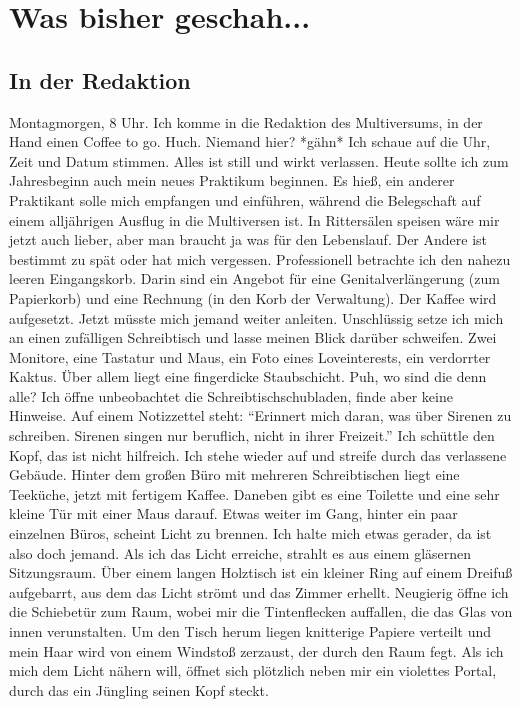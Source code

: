 \documentclass[final]{multiversum}
\begin{document}
\makemultititle
%

\section{Was bisher geschah...}

\subsection{In der Redaktion}
Montagmorgen, 8 Uhr. 
Ich komme in die Redaktion des Multiversums, in der Hand einen Coffee to go.
Huch. Niemand hier? *gähn*
Ich schaue auf die Uhr, Zeit und Datum stimmen.
Alles ist still und wirkt verlassen.
Heute sollte ich zum Jahresbeginn auch mein neues Praktikum beginnen.
Es hieß, ein anderer Praktikant solle mich empfangen und einführen, während die Belegschaft auf einem alljährigen Ausflug in die Multiversen ist.
In Rittersälen speisen wäre mir jetzt auch lieber, aber man braucht ja was für den Lebenslauf.
Der Andere ist bestimmt zu spät oder hat mich vergessen.
Professionell betrachte ich den nahezu leeren Eingangskorb.
Darin sind ein Angebot für eine Genitalverlängerung (zum Papierkorb) und eine Rechnung (in den Korb der Verwaltung).
Der Kaffee wird aufgesetzt.
Jetzt müsste mich jemand weiter anleiten.
Unschlüssig setze ich mich an einen zufälligen Schreibtisch und lasse meinen Blick darüber schweifen.
Zwei Monitore, eine Tastatur und Maus, ein Foto eines Loveinterests, ein verdorrter Kaktus.
Über allem liegt eine fingerdicke Staubschicht.
Puh, wo sind die denn alle?
Ich öffne unbeobachtet die Schreibtischschubladen, finde aber keine Hinweise.
Auf einem Notizzettel steht: \enquote{Erinnert mich daran, was über Sirenen zu schreiben. Sirenen singen nur beruflich, nicht in ihrer Freizeit.}
Ich schüttle den Kopf, das ist nicht hilfreich.
Ich stehe wieder auf und streife durch das verlassene Gebäude.
Hinter dem großen Büro mit mehreren Schreibtischen liegt eine Teeküche, jetzt mit fertigem Kaffee.
Daneben gibt es eine Toilette und eine sehr kleine Tür mit einer Maus darauf.
Etwas weiter im Gang, hinter ein paar einzelnen Büros, scheint Licht zu brennen.
Ich halte mich etwas gerader, da ist also doch jemand.
Als ich das Licht erreiche, strahlt es aus einem gläsernen Sitzungsraum.
Über einem langen Holztisch ist ein kleiner Ring auf einem Dreifuß aufgebarrt, aus dem das Licht strömt und das Zimmer erhellt.
Neugierig öffne ich die Schiebetür zum Raum, wobei mir die Tintenflecken auffallen, die das Glas von innen verunstalten.
Um den Tisch herum liegen knitterige Papiere verteilt und mein Haar wird von einem Windstoß zerzaust, der durch den Raum fegt.
Als ich mich dem Licht nähern will, öffnet sich plötzlich neben mir ein violettes Portal, durch das ein Jüngling seinen Kopf steckt.
\end{document}
